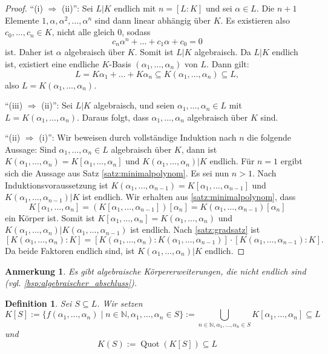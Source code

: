 \documentclass[a4paper, twoside, 11pt, ngerman]{report}
\newcommand{\NN}{\mathds N}
\DeclareMathOperator{\Quot}{Quot}
\theoremstyle{definistyle}
\newtheorem{defini}[satz]{Definition}
\newtheorem{anm}[satz]{Anmerkung}
\theoremstyle{remark}
\begin{document}
\begin{proof}
"`(i) $\Rightarrow$ (ii)"': Sei $L|K$ endlich mit $n = [L : K]$ und sei $\alpha \in L$. Die $n+1$ Elemente $1, \alpha, \alpha^2, \dots, \alpha^n$ sind dann linear abhängig über $K$.
    Es existieren also $c_0, \dots, c_n \in K$, nicht alle gleich $0$, sodass
    \[
    c_n \alpha^n + \dots + c_1 \alpha + c_0 = 0
    \]
    ist. Daher ist $\alpha$ algebraisch über $K$. Somit ist $L|K$ algebraisch.
    Da $L|K$ endlich ist, existiert eine endliche $K$-Basis $(\alpha_1, \dots, \alpha_n)$ von $L$. Dann gilt:
    \[
    L = K\alpha_1 + \ldots + K\alpha_n \subseteq K(\alpha_1, \ldots, \alpha_n) \subseteq L,
    \]
    also $L = K(\alpha_1, \ldots, \alpha_n)$.

"`(iii) $\Rightarrow$ (ii)"': Sei $L|K$ algebraisch, und seien $\alpha_1, \dots, \alpha_n \in L$ mit $L = K(\alpha_1, \dots, \alpha_n)$. Daraus folgt, dass $\alpha_1, \dots, \alpha_n$ algebraisch über $K$ sind. 

"`(ii) $\Rightarrow$ (i)"':
Wir beweisen durch vollständige Induktion nach $n$ die folgende Aussage: Sind $\alpha_1, \dots, \alpha_n\in L$ algebraisch über $K$, dann ist $K(\alpha_1,\ldots,\alpha_n)=K[\alpha_1,\ldots,\alpha_n]$ und $K(\alpha_1, \dots, \alpha_n)|K$ endlich. Für $n = 1$ ergibt sich die Aussage aus Satz \ref{satz:minimalpolynom}. Es sei nun $n>1$.
Nach Induktionsvoraussetzung ist $K(\alpha_1, \dots, \alpha_{n-1})=K[\alpha_1, \dots, \alpha_{n-1}]$ und $K(\alpha_1, \dots, \alpha_{n-1}) | K$ ist endlich. Wir erhalten aus \ref{satz:minimalpolynom}, dass
\[
K[\alpha_1, \ldots, \alpha_n] = (K[\alpha_1, \ldots, \alpha_{n-1}])[\alpha_{n}]=K(\alpha_1,\ldots,\alpha_{n-1})[\alpha_n]
\]
ein Körper ist. Somit ist $K[\alpha_1, \ldots, \alpha_n]=K(\alpha_1, \ldots, \alpha_n)$ und 
$K(\alpha_1, \ldots, \alpha_n)|K(\alpha_1, \ldots, \alpha_{n-1})$ ist endlich. Nach \ref{satz:gradsatz} ist
\[
[K(\alpha_1, \dots, \alpha_n) : K] = [K(\alpha_1, \dots, \alpha_n) : K(\alpha_1, \dots, \alpha_{n-1})] \cdot [K(\alpha_1, \dots, \alpha_{n-1}) : K].
\]
Da beide Faktoren endlich sind, ist $K(\alpha_1, \dots, \alpha_n)|K$ endlich.
\end{proof}

\begin{anm}
Es gibt algebraische Körpererweiterungen, die nicht endlich sind (vgl. \ref{bsp:algebraischer_abschluss}).
\end{anm}

\begin{defini}\label{def:erweiterung_koerper_kleinst}
Sei $S \subseteq L$. Wir setzen
\[
K[S] := \{f(\alpha_1, \dots, \alpha_n) \mid n \in \NN, \alpha_1, \dots, \alpha_n \in S\}:=\bigcup_{n\in\NN,\alpha_1,\ldots,\alpha_n\in S}K[\alpha_1,\ldots,\alpha_n] \subseteq L
\]
und
\[
K(S) := \Quot(K[S]) \subseteq L
\]
\end{defini}
\end{document}
